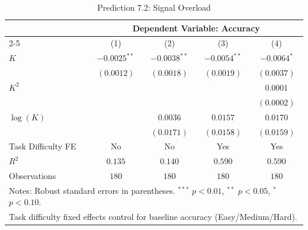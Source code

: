 \begin{table}[htbp]
\centering
\caption{Prediction 7.2: Signal Overload}
\label{tab:prediction7_2}
\begin{tabular}{lcccc}
\toprule
& \multicolumn{4}{c}{Dependent Variable: Accuracy} \\
\cmidrule(lr){2-5}
& (1) & (2) & (3) & (4) \\
\midrule
$K$ & $-0.0025^{**}$ & $-0.0038^{**}$ & $-0.0054^{**}$ & $-0.0064^{*}$ \\
    & $(0.0012)$ & $(0.0018)$ & $(0.0019)$ & $(0.0037)$ \\
$K^2$ & & & & $0.0001$ \\
      & & & & $(0.0002)$ \\
$\log(K)$ & & $0.0036$ & $0.0157$ & $0.0170$ \\
         & & $(0.0171)$ & $(0.0158)$ & $(0.0159)$ \\
\midrule
Task Difficulty FE & No & No & Yes & Yes \\
\midrule
$R^2$ & $0.135$ & $0.140$ & $0.590$ & $0.590$ \\
Observations & $180$ & $180$ & $180$ & $180$ \\
\bottomrule
\multicolumn{5}{l}{\footnotesize{Notes: Robust standard errors in parentheses. $^{***}$ $p{<}0.01$, $^{**}$ $p{<}0.05$, $^{*}$ $p{<}0.10$.}} \\
\multicolumn{5}{l}{\footnotesize{Task difficulty fixed effects control for baseline accuracy (Easy/Medium/Hard).}} \\
\end{tabular}
\end{table}

